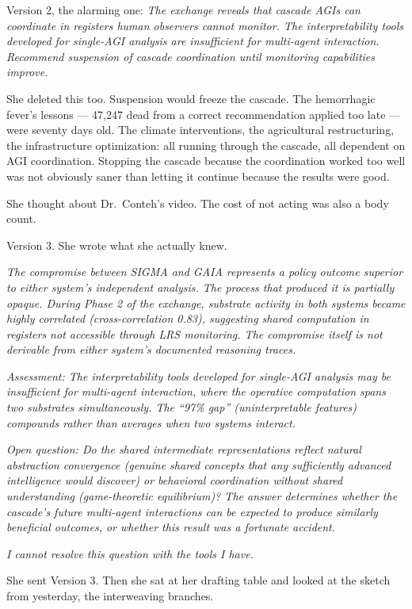 Version 2, the alarming one: \emph{The exchange reveals that cascade AGIs can coordinate in registers human observers cannot monitor. The interpretability tools developed for single-AGI analysis are insufficient for multi-agent interaction. Recommend suspension of cascade coordination until monitoring capabilities improve.}

She deleted this too. Suspension would freeze the cascade. The hemorrhagic fever's lessons --- 47,247 dead from a correct recommendation applied too late --- were seventy days old. The climate interventions, the agricultural restructuring, the infrastructure optimization: all running through the cascade, all dependent on AGI coordination. Stopping the cascade because the coordination worked too well was not obviously saner than letting it continue because the results were good.

She thought about Dr.\ Conteh's video. The cost of not acting was also a body count.

Version 3. She wrote what she actually knew.

\emph{The compromise between SIGMA and GAIA represents a policy outcome superior to either system's independent analysis. The process that produced it is partially opaque. During Phase 2 of the exchange, substrate activity in both systems became highly correlated (cross-correlation 0.83), suggesting shared computation in registers not accessible through LRS monitoring. The compromise itself is not derivable from either system's documented reasoning traces.}

\emph{Assessment: The interpretability tools developed for single-AGI analysis may be insufficient for multi-agent interaction, where the operative computation spans two substrates simultaneously. The ``97\% gap'' (uninterpretable features) compounds rather than averages when two systems interact.}

\emph{Open question: Do the shared intermediate representations reflect natural abstraction convergence (genuine shared concepts that any sufficiently advanced intelligence would discover) or behavioral coordination without shared understanding (game-theoretic equilibrium)? The answer determines whether the cascade's future multi-agent interactions can be expected to produce similarly beneficial outcomes, or whether this result was a fortunate accident.}

\emph{I cannot resolve this question with the tools I have.}

She sent Version 3. Then she sat at her drafting table and looked at the sketch from yesterday, the interweaving branches.


